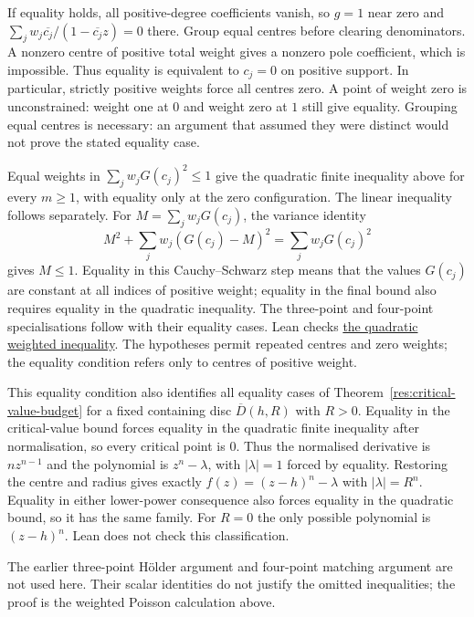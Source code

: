 \documentclass[11pt]{article}
\begin{document}
If equality holds, all positive-degree coefficients vanish, so $g=1$ near
zero and $\sum_jw_j\overline{c_j}/(1-\overline{c_j}z)=0$ there.
Group equal centres before clearing denominators. A nonzero centre of positive
total weight gives a nonzero pole coefficient, which is impossible. Thus
equality is equivalent to $c_j=0$ on positive support. In particular,
strictly positive weights force all centres zero. A point of weight zero
is unconstrained: weight one at $0$ and weight zero at $1$ still give
equality.
Grouping equal centres is necessary: an argument that assumed they
were distinct would not prove the stated equality case.

Equal weights in $\sum_jw_jG(c_j)^2\le1$ give the quadratic finite
inequality above for every $m\ge1$, with equality only at the zero
configuration. The linear inequality follows separately. For
$M=\sum_jw_jG(c_j)$, the variance identity
\[
 M^2+\sum_jw_j(G(c_j)-M)^2=\sum_jw_jG(c_j)^2
\]
gives $M\le1$. Equality in this Cauchy--Schwarz step means that the
values $G(c_j)$ are constant at all indices of positive weight; equality
in the final bound also requires equality in the quadratic inequality. The
three-point and four-point specialisations follow with their equality
cases.  Lean checks
\href{https://github.com/wcook04/plectis-erdos/blob/3d6d938d696fed0fb71dd55115a18a73738ff223/lean/ErdosProblems/Erdos1041/PaperWeightedRefinementsR10.lean\#L17}{the quadratic weighted inequality}.
The hypotheses permit repeated centres and zero weights;
the equality condition refers only to centres of positive weight.

This equality condition also identifies all equality cases of
Theorem~\ref{res:critical-value-budget} for a fixed containing disc
$\overline D(h,R)$ with $R>0$. Equality in the critical-value bound
forces equality in the quadratic finite inequality after normalisation,
so every critical point is $0$. Thus the normalised derivative is
$nz^{n-1}$ and the polynomial is $z^n-\lambda$, with $|\lambda|=1$
forced by equality. Restoring the centre and radius gives exactly
$f(z)=(z-h)^n-\lambda$ with $|\lambda|=R^n$.
Equality in either lower-power consequence also forces equality in the
quadratic bound, so it has the same family. For $R=0$ the only possible
polynomial is $(z-h)^n$. Lean does not check this classification.

The earlier three-point H\"older argument and four-point matching argument
are not used here. Their scalar identities do not justify the omitted
inequalities; the proof is the weighted Poisson calculation above.
\end{document}
